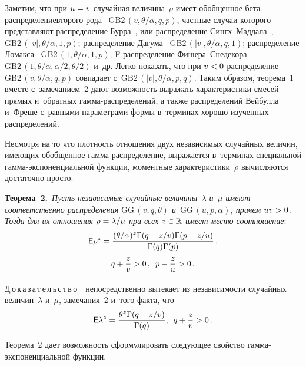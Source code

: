\begin{multicols}{2}
Заметим, что при $u\hm=v$ случайная величина~$\rho$ имеет обобщенное 
бе\-та-рас\-пре\-де\-ле\-ние\linebreak второго рода~\cite{McDonald1984} $\mathrm{GB2}\,(v,\theta/\alpha,q,p)$, 
частные случаи которого представляют распределение Бурра~\cite{Burr1942}, или 
распределение Сингх--Мад\-да\-ла~\cite{SiMa1976}, 
$\mathrm{GB2}\,(|v|,\theta/\alpha,1,p)$;
распределение Дагума~\cite{Dagum1977} $\mathrm{GB2}\,(|v|,\theta/\alpha,q,1)$;
распределение Ломакса~\cite{Lomax1954} $\mathrm{GB2}\,(1,\theta/\alpha,1,p)$;
F-распределение Фи\-ше\-ра--Сне\-де\-ко\-ра~\cite{KoPoSkTu1985} 
$\mathrm{GB2}\,(1,\theta/\alpha,\alpha/2,\theta/2)$
и~др.
Легко показать, что при $v\hm<0$ распределение $\mathrm{GB2}\,(v,\theta/\alpha,q,p)$ 
совпадает с~$\mathrm{GB2}\,(|v|,\theta/\alpha,p,q)$.
Таким образом, тео\-ре\-ма~1 вместе с~замечанием~2 
дают возможность выражать характеристики смесей прямых и~обратных 
гам\-ма-рас\-пре\-де\-ле\-ний, а также распределений Вейбулла и~Фреше с~равными параметрами 
формы в~терминах хорошо изученных распределений.


Несмотря на то что плотность отношения двух независимых случайных величин, 
имеющих обобщенное гам\-ма-рас\-пре\-де\-ле\-ние, выражается в~терминах специальной 
гам\-ма-экс\-по\-нен\-ци\-аль\-ной функции, моментные характеристики~$\rho$ вычисляются достаточно 
просто.

\bigskip

\noindent
\textbf{Теорема~2.}\
\textit{Пусть независимые случайные величины~$\lambda$ и~$\mu$ имеют соответственно 
распределения $\mathrm{GG}\,(v,q,\theta)$ и~$\mathrm{GG}\,(u,p,\alpha)$, причем $uv\hm>0$. Тогда для их 
отношения $\rho\hm=\lambda/\mu$ при всех $z\hm\in\mathbb{R}$ имеет место соотношение}:
\begin{multline*}
{\sf E}\rho^z=\displaystyle\frac{\displaystyle (\theta/\alpha)^{z} \Gamma(q+z/v)\Gamma(p-z/u)\mathstrut}{\displaystyle \Gamma(q)\Gamma(p)\mathstrut}\,, \\
q+\displaystyle\frac{\displaystyle z\mathstrut}{\displaystyle v\mathstrut}>0\,, \enskip p-\displaystyle\frac{\displaystyle z\mathstrut}{\displaystyle u\mathstrut}>0\,.
\end{multline*}



\noindent
Д\,о\,к\,а\,з\,а\,т\,е\,л\,ь\,с\,т\,в\,о\ \
 непосредственно вытекает из независимости случайных 
величин~$\lambda$ и~$\mu$, замечания~2 и~того факта, что
$$
{\sf E}\lambda^z=\displaystyle\frac{\displaystyle \theta^{z} \Gamma(q+z/v)\mathstrut}{\displaystyle \Gamma(q)\mathstrut},\enskip q+\displaystyle\frac{\displaystyle z\mathstrut}{\displaystyle v\mathstrut}>0\,.
$$

Теорема~2 дает возможность сформулировать следующее свойство 
гам\-ма-экс\-по\-нен\-ци\-аль\-ной функции. %


\end{multicols}
